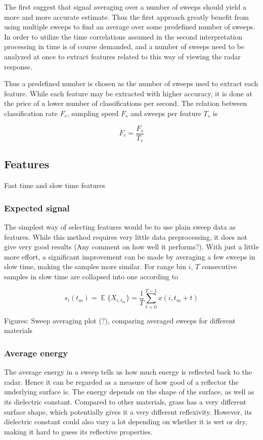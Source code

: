 \documentclass[a4paper, 12pt]{article}
\DeclareMathOperator*{\E}{\mathbb{E}}
\begin{document}
The first suggest that signal averaging over a number of sweeps should yield a more and more accurate estimate. Thus the first approach greatly benefit from using multiple sweeps to find an average over some predefined number of sweeps.  In order to utilize the time correlations assumed in the second interpretation processing in time is of course demanded, and a number of sweeps need to be analyzed at once to extract features related to this way of viewing the radar response. 

Thus a predefined number is chosen as the number of sweeps used to extract each feature. While each feature may be extracted with higher accuracy, it is done at the price of a lower number of classifications per second. The relation between classification rate $F_c$, sampling speed $F_s$ and sweeps per feature $T_s$ is



\begin{equation}
	F_c = \frac{F_s}{T_s}
\end{equation}

\subsection{Features}

Fast time and slow time features 



\subsubsection{Expected signal}
The simplest way of selecting features would be to use plain sweep data as features. While this method requires very little data preprocessing, it does not give very good results (Any comment on how well it performs?). With just a little more effort, a significant improvement can be made by averaging a few sweeps in slow time, making the samples more similar. For range bin $i$, $T$ consecutive samples in slow time are collapsed into one according to

\begin{equation}
	s_i(t_m) = \E\{X_{i,t_m}\} = \frac{1}{T}\sum_{t=0}^{T-1}x(i, t_m + t)
\end{equation}

Figures: Sweep averaging plot (?), comparing averaged sweeps for different materials

\subsubsection{Average energy}
The average energy in a sweep tells us how much energy is reflected back to the radar. Hence it can be regarded as a measure of how good of a reflector the underlying surface is. The energy depends on the shape of the surface, as well as its dielectric constant. Compared to other materials, grass has a very different surface shape, which potentially gives it a very different reflexivity. However, its dielectric constant could also vary a lot depending on whether it is wet or dry, making it hard to guess its reflective properties.
\end{document}

